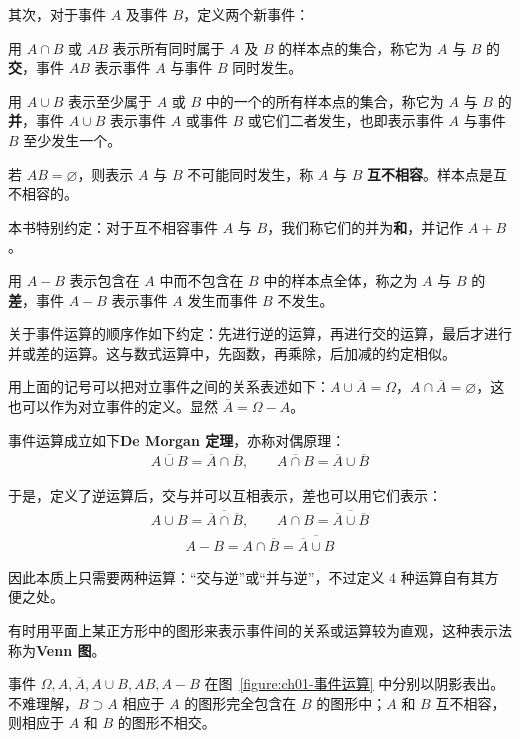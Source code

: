 \documentclass[../../main.tex]{subfiles}
\begin{document}
其次，对于事件 $A$ 及事件 $B$，定义两个新事件：

用 $A\cap B$ 或 $AB$ 表示所有同时属于 $A$ 及 $B$ 的样本点的集合，称它为 $A$ 与 $B$ 的\textbf{交}，事件 $AB$ 表示事件 $A$ 与事件 $B$ 同时发生。

用 $A\cup B$ 表示至少属于 $A$ 或 $B$ 中的一个的所有样本点的集合，称它为 $A$ 与 $B$ 的\textbf{并}，事件 $A\cup B$ 表示事件 $A$ 或事件 $B$ 或它们二者发生，也即表示事件 $A$ 与事件 $B$ 至少发生一个。

若 $AB=\varnothing$，则表示 $A$ 与 $B$ 不可能同时发生，称 $A$ 与 $B$ \textbf{互不相容}。样本点是互不相容的。

本书特别约定：对于互不相容事件 $A$ 与 $B$，我们称它们的并为\textbf{和}，并记作 $A+B$。

用 $A-B$ 表示包含在 $A$ 中而不包含在 $B$ 中的样本点全体，称之为 $A$ 与 $B$ 的\textbf{差}，事件 $A-B$ 表示事件 $A$ 发生而事件 $B$ 不发生。

关于事件运算的顺序作如下约定：先进行逆的运算，再进行交的运算，最后才进行并或差的运算。这与数式运算中，先函数，再乘除，后加减的约定相似。

用上面的记号可以把对立事件之间的关系表述如下：$A\cup\overline{A}=\Omega$，$A\cap\overline{A}=\varnothing$，这也可以作为对立事件的定义。显然 $\overline{A}=\Omega-A$。

事件运算成立如下\textbf{De Morgan 定理}，亦称对偶原理：
\begin{align}
\overline{A\cup B}=\overline{A}\cap\overline{B},\qquad \overline{A\cap B}=\overline{A}\cup\overline{B}\label{align:ch01-de-morgan}
\end{align}

于是，定义了逆运算后，交与并可以互相表示，差也可以用它们表示：
\begin{align*}
A\cup B=\overline{\overline{A}\cap\overline{B}},\qquad A\cap B=\overline{\overline{A}\cup\overline{B}}
\end{align*}
\begin{align*}
A-B=A\cap\overline{B}=\overline{\overline{A}\cup B}
\end{align*}

因此本质上只需要两种运算：“交与逆”或“并与逆”，不过定义 $4$ 种运算自有其方便之处。

有时用平面上某正方形中的图形来表示事件间的关系或运算较为直观，这种表示法称为\textbf{Venn 图}。

事件 $\Omega,A,\overline{A},A\cup B,AB,A-B$ 在图~\ref{figure:ch01-事件运算} 中分别以阴影表出。不难理解，$B\supset A$ 相应于 $A$ 的图形完全包含在 $B$ 的图形中；$A$ 和 $B$ 互不相容，则相应于 $A$ 和 $B$ 的图形不相交。
\end{document}
